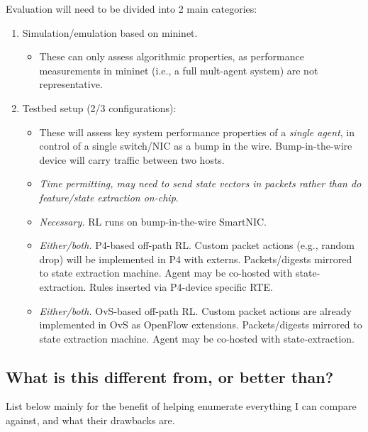\documentclass[sigconf,natbib=false]{acmart}
\begin{document}
Evaluation will need to be divided into 2 main categories:
\begin{enumerate}
	\item Simulation/emulation based on mininet.
	\begin{itemize}
		\item These can only assess algorithmic properties, as performance measurements in mininet (i.e., a full mult-agent system) are not representative.
	\end{itemize}
	\item Testbed setup (2/3 configurations):
	\begin{itemize}
		\item These will assess key system performance properties of a \emph{single agent}, in control of a single switch/NIC as a bump in the wire. Bump-in-the-wire device will carry traffic between two hosts.
		\item \emph{Time permitting, may need to send state vectors in packets rather than do feature/state extraction on-chip}.
		\item \emph{Necessary.} RL runs on bump-in-the-wire SmartNIC.
		\item \emph{Either/both.} P4-based off-path RL. Custom packet actions (e.g., random drop) will be implemented in P4 with externs. Packets/digests mirrored to state extraction machine. Agent may be co-hosted with state-extraction. Rules inserted via P4-device specific RTE.
		\item \emph{Either/both.} OvS-based off-path RL. Custom packet actions are already implemented in OvS as OpenFlow extensions. Packets/digests mirrored to state extraction machine. Agent may be co-hosted with state-extraction.
	\end{itemize}
\end{enumerate}

\subsection{What is this different from, or better than?}
List below mainly for the benefit of helping enumerate everything I can compare against, and what their drawbacks are.
\end{document}
